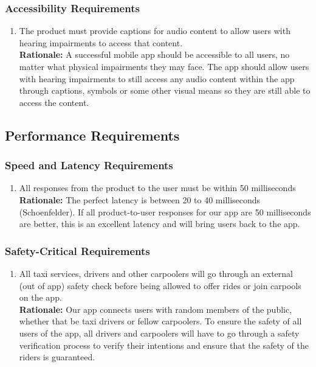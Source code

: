 \documentclass[]{article}
\begin{document}
\subsubsection{Accessibility Requirements}
\label{ssub:accessibility_requirements}
\begin{enumerate}[{UH-A}1. ]
	\item The product must provide captions for audio content to allow users with hearing impairments to access that content. \\
	{\bf Rationale:} A successful mobile app should be accessible to all users, no matter what physical impairments they may face. The app should allow users with hearing impairments to still access any audio content within the app through captions, symbols or some other visual means so they are still able to access the content.
\end{enumerate}


\subsection{Performance Requirements}
\label{sub:performance_requirements}

\subsubsection{Speed and Latency Requirements}
\label{ssub:speed_and_latency_requirements}
\begin{enumerate}[{PR-SL}1. ]
	\item All responses from the product to the user must be within 50 milliseconds \\
	{\bf Rationale:} The perfect latency is between 20 to 40 milliseconds (Schoenfelder). If all product-to-user responses for our app are 50 milliseconds are better, this is an excellent latency and will bring users back to the app.
\end{enumerate}

\subsubsection{Safety-Critical Requirements}
\label{ssub:safety_critical_requirements}
\begin{enumerate}[{PR-SC}1. ]
	\item All taxi services, drivers and other carpoolers will go through an external (out of app) safety check before being allowed to offer rides or join carpools on the app. \\
	{\bf Rationale:} Our app connects users with random members of the public, whether that be taxi drivers or fellow carpoolers. To ensure the safety of all users of the app, all drivers and carpoolers will have to go through a safety verification process to verify their intentions and ensure that the safety of the riders is guaranteed.
\end{enumerate}
\end{document}
